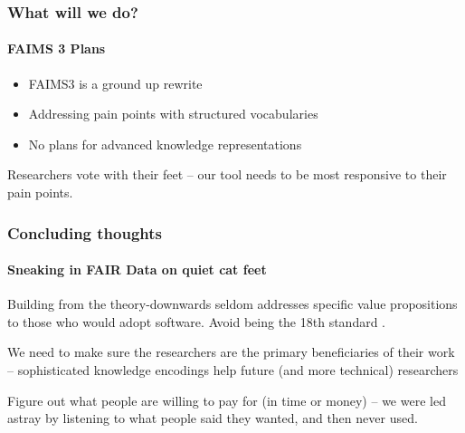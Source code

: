 \documentclass[
	aspectratio=169, %
	12pt, %
	t, %
]{beamer}
\begin{document}
\begin{frame}
	\frametitle{What will we do?}
 	\framesubtitle{FAIMS 3 Plans}


    \begin{itemize}
        \item FAIMS3 is a ground up rewrite
\item Addressing pain points with structured vocabularies
\item No plans for advanced knowledge representations

    \end{itemize}


Researchers vote with their feet -- our tool needs to be most responsive to their pain points. 

\end{frame}



\begin{frame}
	\frametitle{Concluding thoughts}
 	\framesubtitle{Sneaking in FAIR Data on quiet cat feet}


Building from the theory-downwards seldom addresses specific value propositions to those who would adopt software. Avoid being the 18th standard \parencite{Munroe2011-zg}.


We need to make sure the researchers are the primary beneficiaries of their work -- sophisticated knowledge encodings help future (and more technical) researchers


Figure out what people are willing to pay for (in time or money) -- we were led astray by listening to what people said they wanted, and then never used.

\end{frame}


\end{document}
